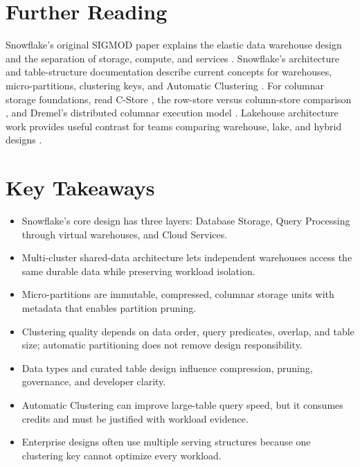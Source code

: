 \section{Further Reading}
Snowflake's original SIGMOD paper explains the elastic data warehouse design and the separation of storage, compute, and services \cite{dageville2016snowflake}. Snowflake's architecture and table-structure documentation describe current concepts for warehouses, micro-partitions, clustering keys, and Automatic Clustering \cite{snowflakeArchitectureDocs,snowflakeTablesDocs,snowflakeClusteringDocs,snowflakeAutomaticClusteringDocs}. For columnar storage foundations, read C-Store \cite{stonebraker2005cstore}, the row-store versus column-store comparison \cite{abadi2009columnstores}, and Dremel's distributed columnar execution model \cite{melnik2010dremel}. Lakehouse architecture work provides useful contrast for teams comparing warehouse, lake, and hybrid designs \cite{armbrust2021lakehouse}.

\section*{Key Takeaways}
\begin{itemize}
    \item Snowflake's core design has three layers: Database Storage, Query Processing through virtual warehouses, and Cloud Services.
    \item Multi-cluster shared-data architecture lets independent warehouses access the same durable data while preserving workload isolation.
    \item Micro-partitions are immutable, compressed, columnar storage units with metadata that enables partition pruning.
    \item Clustering quality depends on data order, query predicates, overlap, and table size; automatic partitioning does not remove design responsibility.
    \item Data types and curated table design influence compression, pruning, governance, and developer clarity.
    \item Automatic Clustering can improve large-table query speed, but it consumes credits and must be justified with workload evidence.
    \item Enterprise designs often use multiple serving structures because one clustering key cannot optimize every workload.
\end{itemize}

